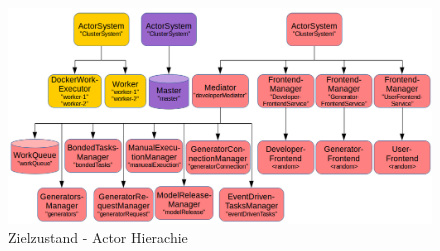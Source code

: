 \begin{figure}
    \centering
    \includegraphics[width=5in]{figures/actor_hierachy_final.png}
    \caption{Zielzustand - Actor Hierachie}
    \label{fig:ZETA_HIERACHY_NEW}
\end{figure}

